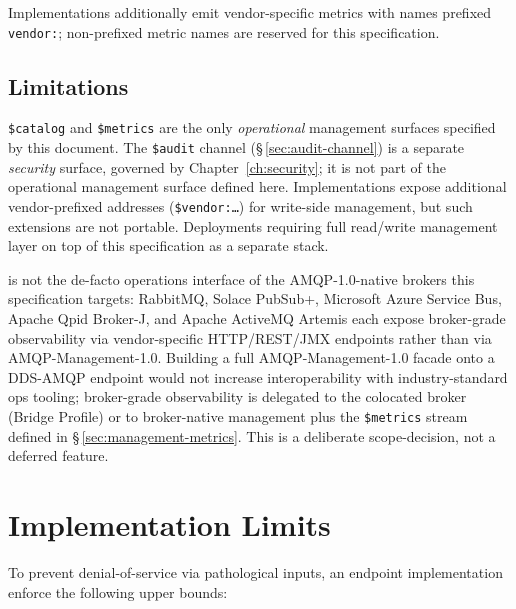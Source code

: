 \documentclass{../styles/zerodds-vendor-spec}
\begin{document}
Implementations  additionally emit vendor-specific
metrics with names prefixed \texttt{vendor:}; non-prefixed
metric names are reserved for this specification.

\subsection{Limitations}

\texttt{\$catalog} and \texttt{\$metrics} are the only
\emph{operational} management surfaces specified by this
document. The \texttt{\$audit} channel
(\S\,\ref{sec:audit-channel}) is a separate \emph{security}
surface, governed by Chapter~\ref{ch:security}; it is not part
of the operational management surface defined here.
Implementations  expose additional vendor-prefixed
addresses (\texttt{\$vendor:\ldots}) for write-side management,
but such extensions are not portable. Deployments requiring
full read/write management  layer
 on top of this specification as a
separate stack.

\begin{specnote}
 is not the de-facto operations
interface of the AMQP-1.0-native brokers this specification
targets: RabbitMQ, Solace PubSub+, Microsoft Azure Service Bus,
Apache Qpid Broker-J, and Apache ActiveMQ Artemis each expose
broker-grade observability via vendor-specific HTTP/REST/JMX
endpoints rather than via AMQP-Management-1.0. Building a full
AMQP-Management-1.0 facade onto a DDS-AMQP endpoint would not
increase interoperability with industry-standard ops tooling;
broker-grade observability is delegated to the colocated broker
(Bridge Profile) or to broker-native management plus the
\texttt{\$metrics} stream defined in
\S\,\ref{sec:management-metrics}. This is a deliberate
scope-decision, not a deferred feature.
\end{specnote}

\section{Implementation Limits}\label{sec:pim-impl-limits}

To prevent denial-of-service via pathological inputs, an
endpoint implementation  enforce the following
upper bounds:
\end{document}

